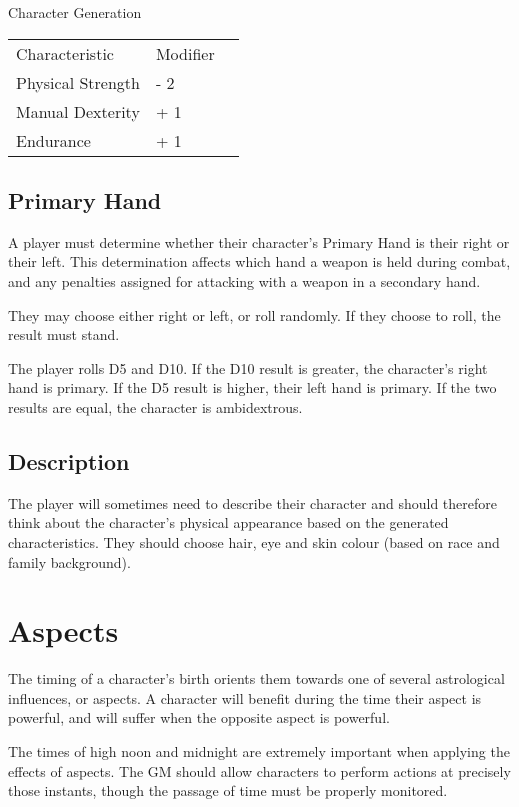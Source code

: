 \begin{Chapter}{Character Generation}
\begin{tabularx}{\columnwidth}{lll}
Characteristic		& Modifier \\
Physical Strength	& - 2 \\
Manual Dexterity	& + 1 \\
Endurance		& + 1 \\
\end{tabularx}

\subsection{Primary Hand}

A player must determine whether their character’s Primary Hand is
their right or their left.  This determination affects which hand a
weapon is held during combat, and any penalties assigned for attacking
with a weapon in a secondary hand.

They may choose either right or left, or roll randomly. If they choose
to roll, the result must stand.

The player rolls D5 and D10.  If the D10 result is greater, the
character’s right hand is primary. If the D5 result is higher, their
left hand is primary. If the two results are equal, the character is
ambidextrous.

\subsection{Description}

The player will sometimes need to describe their character and should
therefore think about the character’s physical appearance based on the
generated characteristics.  They should choose hair, eye and skin
colour (based on race and family background).

\section{Aspects}
\label{aspects}

The timing of a character’s birth orients them towards one of several
astrological influences, or aspects.  A character will benefit during
the time their aspect is powerful, and will suffer when the opposite
aspect is powerful.

The times of high noon and midnight are extremely important when
applying the effects of aspects.  The GM should allow characters to
perform actions at precisely those instants, though the passage of
time must be properly monitored.


\end{Chapter}
